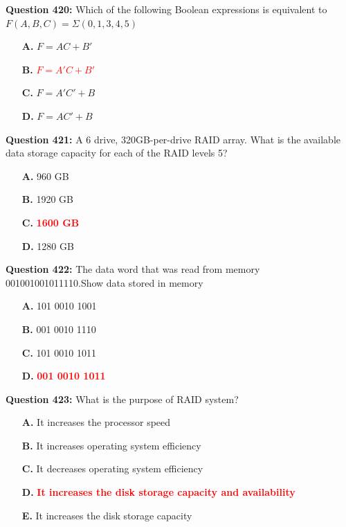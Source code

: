 \documentclass[12pt,a4paper]{article}
\begin{document}
\vspace{0.5cm}

\textbf{Question 420:} Which of the following Boolean expressions is equivalent to $F(A, B, C) = \Sigma(0, 1, 3, 4, 5)$

\begin{itemize}
    \item[\textbf{A.}] $F = AC + B'$
    \item[\textbf{B.}] \textcolor{red}{\textbf{$F = A'C + B'$}}
    \item[\textbf{C.}] $F = A'C' + B$
    \item[\textbf{D.}] $F = AC' + B$
\end{itemize}

\vspace{0.5cm}

\textbf{Question 421:} A 6 drive, 320GB-per-drive RAID array. What is the available data storage capacity for each of the RAID levels 5?

\begin{itemize}
    \item[\textbf{A.}] 960 GB
    \item[\textbf{B.}] 1920 GB
    \item[\textbf{C.}] \textcolor{red}{\textbf{1600 GB}}
    \item[\textbf{D.}] 1280 GB
\end{itemize}

\vspace{0.5cm}

\textbf{Question 422:} The data word that was read from memory 001001001011110.Show data stored in memory

\begin{itemize}
    \item[\textbf{A.}] 101 0010 1001
    \item[\textbf{B.}] 001 0010 1110
    \item[\textbf{C.}] 101 0010 1011
    \item[\textbf{D.}] \textcolor{red}{\textbf{001 0010 1011}}
\end{itemize}

\vspace{0.5cm}

\textbf{Question 423:} What is the purpose of RAID system?

\begin{itemize}
    \item[\textbf{A.}] It increases the processor speed
    \item[\textbf{B.}] It increases operating system efficiency
    \item[\textbf{C.}] It decreases operating system efficiency
    \item[\textbf{D.}] \textcolor{red}{\textbf{It increases the disk storage capacity and availability}}
    \item[\textbf{E.}] It increases the disk storage capacity
\end{itemize}
\end{document}
